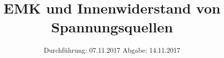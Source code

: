

\subject{V301}
\title{EMK und Innenwiderstand von Spannungsquellen}
\date{%
  Durchführung: 07.11.2017
  \hspace{3em}
  Abgabe: 14.11.2017
}



\maketitle
\thispagestyle{empty}
\tableofcontents
\newpage







\printbibliography{}


